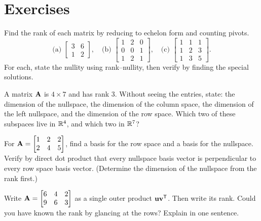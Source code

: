 \section{Exercises}

\begin{exercise}\label{ch16:ex-warmup}
Find the rank of each matrix by reducing to echelon form and counting pivots.
\[
  \text{(a) } \begin{bmatrix} 3 & 6 \\ 1 & 2 \end{bmatrix}, \quad
  \text{(b) } \begin{bmatrix} 1 & 2 & 0 \\ 0 & 0 & 1 \\ 1 & 2 & 1 \end{bmatrix}, \quad
  \text{(c) } \begin{bmatrix} 1 & 1 & 1 \\ 1 & 2 & 3 \\ 1 & 3 & 5 \end{bmatrix}.
\]
For each, state the nullity using rank--nullity, then verify by finding the
special solutions.
\end{exercise}

\begin{exercise}\label{ch16:ex-rn-predict}
A matrix $\mathbf{A}$ is $4\times 7$ and has rank $3$. Without seeing the entries,
state: the dimension of the nullspace, the dimension of the column space, the
dimension of the left nullspace, and the dimension of the row space. Which two of
these subspaces live in $\mathbb{R}^4$, and which two in $\mathbb{R}^7$?
\end{exercise}

\begin{exercise}\label{ch16:ex-perp}
For $\mathbf{A}=\begin{bmatrix} 1 & 2 & 2 \\ 2 & 4 & 5 \end{bmatrix}$, find a basis
for the row space and a basis for the nullspace. Verify by direct dot product
that every nullspace basis vector is perpendicular to every row space basis
vector. (Determine the dimension of the nullspace from the rank first.)
\end{exercise}

\begin{exercise}\label{ch16:ex-outer}
Write $\mathbf{A}=\begin{bmatrix} 6 & 4 & 2 \\ 9 & 6 & 3 \end{bmatrix}$ as a single
outer product $\mathbf{u}\mathbf{v}^{\mathsf{T}}$. Then write its rank. Could you have known the
rank by glancing at the rows? Explain in one sentence.
\end{exercise}

